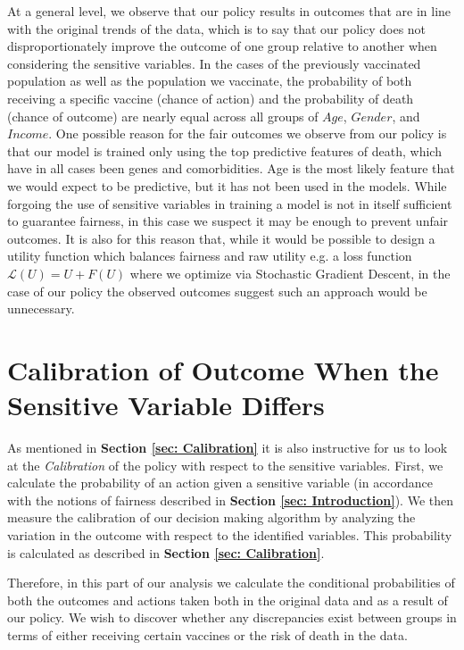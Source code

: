 \documentclass{article}
\begin{document}
At a general level, we observe that our policy results in outcomes that are in line with the original trends of the data, which is to say that our policy does not disproportionately improve the outcome of one group relative to another when considering the sensitive variables. In the cases of the previously vaccinated population as well as the population we vaccinate, the probability of both receiving a specific vaccine (chance of action) and the probability of death (chance of outcome) are nearly equal across all groups of $Age$, $Gender$, and $Income$. One possible reason for the fair outcomes we observe from our policy is that our model is trained only using the top predictive features of death, which have in all cases been genes and comorbidities. Age is the most likely feature that we would expect to be predictive, but it has not been used in the models. While forgoing the use of sensitive variables in training a model is not in itself sufficient to guarantee fairness, in this case we suspect it may be enough to prevent unfair outcomes. It is also for this reason that, while it would be possible to design a utility function which balances fairness and raw utility e.g. a loss function $\mathcal{L}(U) = U + F(U)$ where we optimize via Stochastic Gradient Descent, in the case of our policy the observed outcomes suggest such an approach would be unnecessary.


\section{Calibration of Outcome When the Sensitive Variable Differs}

As mentioned in \textbf{Section \ref{sec: Calibration}} it is also instructive for us to look at the \textit{Calibration} of the policy with respect to the sensitive variables. First, we calculate the probability of an action given a sensitive variable (in accordance with the notions of fairness described in \textbf{Section \ref{sec: Introduction}}). We then measure the calibration of our decision making algorithm by analyzing the variation in the outcome with respect to the identified variables. This probability is calculated as described in \textbf{Section \ref{sec: Calibration}}.

Therefore, in this part of our analysis we calculate the conditional probabilities of both the outcomes and actions taken both in the original data and as a result of our policy. We wish to discover whether any discrepancies exist between groups in terms of either receiving certain vaccines or the risk of death in the data. 
\end{document}
